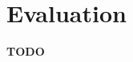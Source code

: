 \documentclass[12pt]{extarticle}
\begin{document}
\section{Evaluation}
\textbf{TODO}




\end{document}
